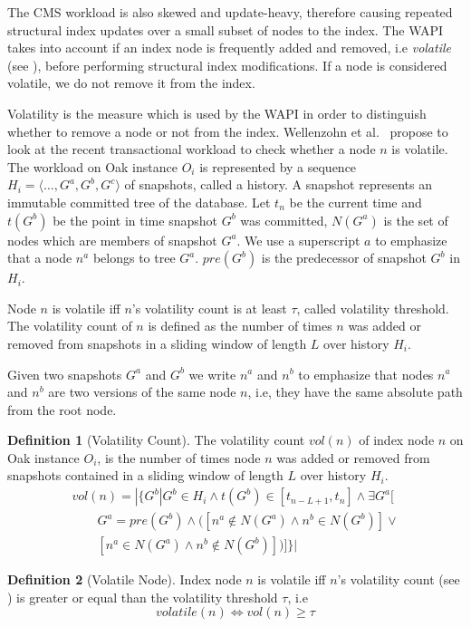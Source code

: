 \message{ !name(thesis.tex)}\documentclass[abstracton,12pt]{scrartcl}
\theoremstyle{definition}
\newtheorem{definition}{Definition}
\begin{document}
The CMS workload is also skewed and update-heavy, therefore causing repeated structural index
updates over a small subset of nodes to the index.
The WAPI takes into account if an index node is frequently added and removed,
i.e \textit{volatile} (see ), before performing structural
index modifications. If a node is considered volatile, we do not remove it from the index.

Volatility is the measure which is used by the WAPI in order to distinguish
whether to remove a node or not from the index.
Wellenzohn et al.~\cite{KW17} propose to look at the recent transactional
workload to check whether a node $n$ is volatile. The workload on Oak instance
$O_i$ is represented by a sequence $H_i = \langle \ldots, G^a, G^b, G^c
\rangle$ of snapshots, called a history. A snapshot represents an immutable
committed tree of the database. Let $t_n$ be the current time and
$t(G^b)$ be the point in time snapshot $G^b$ was committed, $N(G^a)$ is the
set of nodes which are members of snapshot $G^a$. We use a superscript $a$
to emphasize that a node $n^a$ belongs to tree $G^a$. $pre(G^b)$ is the
predecessor of snapshot $G^b$ in $H_i$.

Node $n$ is volatile iff $n$'s volatility count is at least $\tau$, called
volatility threshold. The volatility count of $n$ is defined as the number of
times $n$ was added or removed from snapshots in a sliding window of length
$L$ over history $H_i$.

Given two snapshots $G^a$ and $G^b$ we write $n^a$ and $n^b$ to emphasize that
nodes $n^a$ and $n^b$ are two versions of the same node $n$, i.e, they have
the same absolute path from the root node.

\begin{definition}[Volatility Count]
  The volatility count $vol(n)$ of index node $n$ on Oak instance $O_i$, is the number of
  times node $n$ was added or removed from snapshots contained in a sliding
  window of length $L$ over history $H_i$.
  \begin{align*}
    vol(n) = | \{ G^b | G^b \in H_i \land t(G^b) \in [t_{n-L+1}, t_n] \land \exists G^a[ \\
    \qquad G^a = pre(G^b) \land ([n^a \notin N(G^a) \land n^b \in N(G^b)]\lor \\
    \qquad [n^a \in N(G^a) \land n^b \notin N(G^b)] )]\} |
  \end{align*}
  \label{def:vol_count}
\end{definition}

\begin{definition}[Volatile Node]
  Index node $n$ is volatile iff $n$'s volatility count (see
  ) is greater or equal than the volatility threshold
  $\tau$, i.e
  $$ volatile(n) \iff vol(n) \geq \tau $$
  \label{def:volatile_node}
\end{definition}
\end{document}
